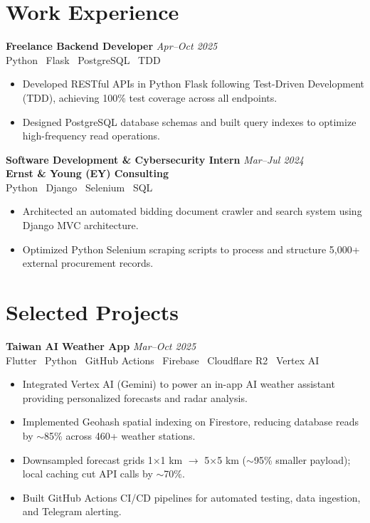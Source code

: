 \documentclass[10pt, a4paper]{article}
\begin{document}
\begin{minipage}[t]{0.6\textwidth}

\section{Work Experience}

\noindent\textbf{Freelance Backend Developer} \hfill \textit{Apr--Oct 2025}\\
{\small Python \textbar\ Flask \textbar\ PostgreSQL \textbar\ TDD}
\begin{itemize}
  \item Developed RESTful APIs in Python Flask following Test-Driven Development (TDD), achieving 100\% test coverage across all endpoints.
  \item Designed PostgreSQL database schemas and built query indexes to optimize high-frequency read operations.
\end{itemize}\vspace{5pt}

\noindent\textbf{Software Development \& Cybersecurity Intern} \hfill \textit{Mar--Jul 2024}\\
\noindent\textbf{Ernst \& Young (EY) Consulting}\\
{\small Python \textbar\ Django \textbar\ Selenium \textbar\ SQL}
\begin{itemize}
  \item Architected an automated bidding document crawler and search system using Django MVC architecture.
  \item Optimized Python Selenium scraping scripts to process and structure 5,000+ external procurement records.
\end{itemize}\vspace{5pt}

\section{Selected Projects}

\noindent\textbf{Taiwan AI Weather App} \hfill \textit{Mar--Oct 2025}\\
{\small Flutter \textbar\ Python \textbar\ GitHub Actions \textbar\ Firebase \textbar\ Cloudflare R2 \textbar\ Vertex AI}
\begin{itemize}
  \item Integrated Vertex AI (Gemini) to power an in-app AI weather assistant providing personalized forecasts and radar analysis.
  \item Implemented Geohash spatial indexing on Firestore, reducing database reads by $\sim$85\% across 460+ weather stations.
  \item Downsampled forecast grids 1×1 km $\to$ 5×5 km ($\sim$95\% smaller payload); local caching cut API calls by $\sim$70\%.
  \item Built GitHub Actions CI/CD pipelines for automated testing, data ingestion, and Telegram alerting.
\end{itemize}\vspace{5pt}


\end{minipage}
\end{document}
